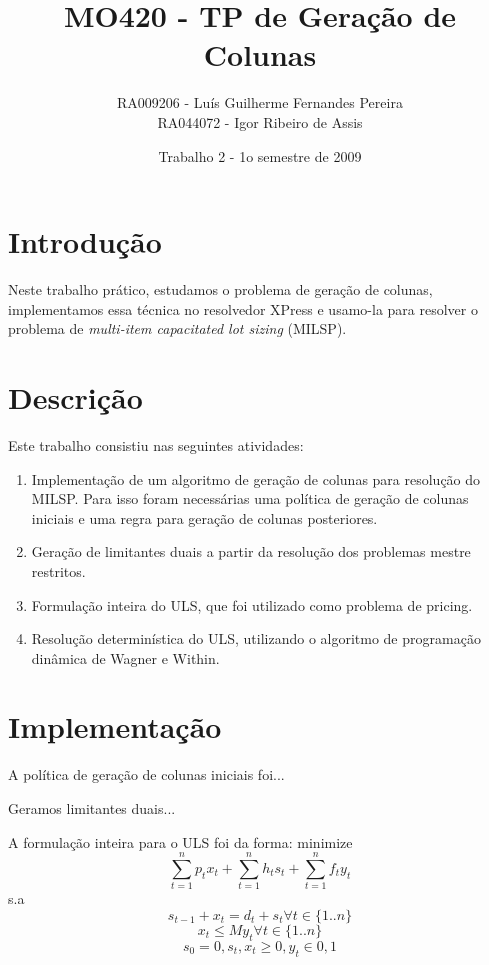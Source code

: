 \documentclass[letterpaper,11pt]{article}
\title{MO420 - TP de Geração de Colunas}
\author{RA009206 - Luís Guilherme Fernandes Pereira \\
RA044072 - Igor Ribeiro de Assis}
\date{Trabalho 2 - 1o semestre de 2009}
\begin{document}
\maketitle

\section{Introdução}

Neste trabalho prático, estudamos o problema de geração de colunas,
implementamos essa técnica no resolvedor XPress e usamo-la para resolver
o problema de \emph{multi-item capacitated lot sizing} (MILSP).

\section{Descrição}
Este trabalho consistiu nas seguintes atividades:

\begin{enumerate}
 \item Implementação de um algoritmo de geração de colunas para
       resolução do MILSP. Para isso foram necessárias uma política de 
       geração de colunas iniciais e uma regra para geração de colunas
       posteriores.
 \item Geração de limitantes duais a partir da resolução dos problemas
       mestre restritos.
 \item Formulação inteira do ULS, que foi utilizado como problema de
       pricing.
 \item Resolução determinística do ULS, utilizando o algoritmo de
       programação dinâmica de Wagner e Within. 
\end{enumerate}

\section{Implementação}
A política de geração de colunas iniciais foi...

Geramos limitantes duais...

A formulação inteira para o ULS foi da forma:
minimize
\begin{equation}
 \sum_{t=1}^n p_tx_t + \sum_{t=1}^n h_ts_t + \sum_{t=1}^n f_ty_t
\end{equation}
s.a
\begin{equation}
 s_{t-1} + x_t = d_t + s_t \forall t \in \{1..n\}
\end{equation}
\begin{equation}
 x_{t} \leq My_t \forall t \in \{1..n\}
\end{equation}
\begin{equation}
 s_0 = 0, s_t, x_t \geq 0, y_t \in {0,1}
\end{equation}
\end{document}
